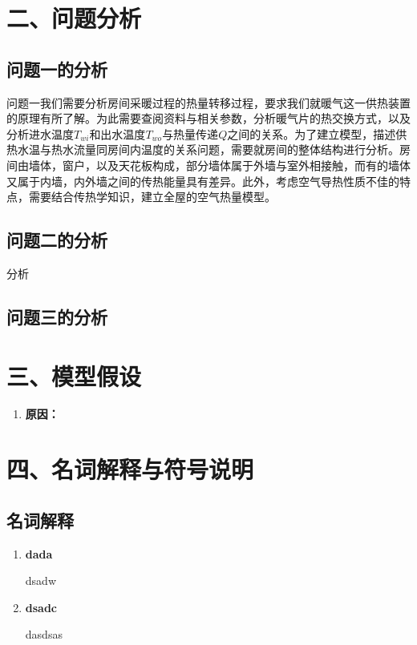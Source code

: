\documentclass{my_paper}
\begin{document}
\section{二、问题分析}
\subsection{问题一的分析}

问题一我们需要分析房间采暖过程的热量转移过程，要求我们就暖气这一供热装置的原理有所了解。为此需要查阅资料与相关参数，分析暖气片的热交换方式，以及分析进水温度$T_{wi}$和出水温度$ T_{wo} $与热量传递$Q$之间的关系。为了建立模型，描述供热水温与热水流量同房间内温度的关系问题，需要就房间的整体结构进行分析。房间由墙体，窗户，以及天花板构成，部分墙体属于外墙与室外相接触，而有的墙体又属于内墙，内外墙之间的传热能量具有差异。此外，考虑空气导热性质不佳的特点，需要结合传热学知识，建立全屋的空气热量模型。

\subsection{问题二的分析}

分析

\subsection{问题三的分析}


\section{三、模型假设}
\begin{enumerate}
    \item 
    
    \textbf{原因：}


\end{enumerate}

\section{四、名词解释与符号说明}
\subsection{名词解释}
\begin{enumerate}
    \item \textbf{dada}
    
    dsadw
    
    \item \textbf{dsadc}
    
    dasdsas

    
\end{enumerate}
\end{document}
